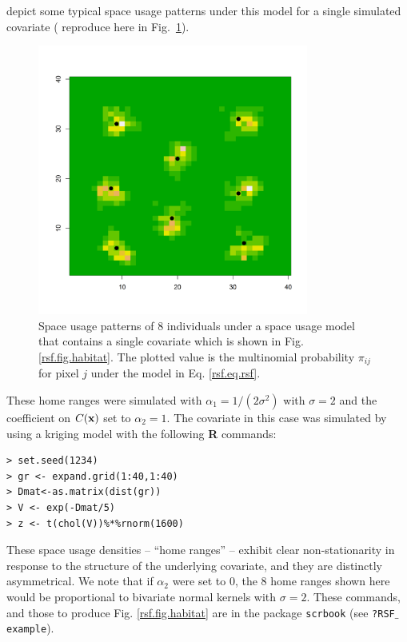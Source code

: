 \citet{royle_etal:2012mee} depict some typical space
usage patterns under this model for a single simulated covariate (
reproduce here in Fig.~\ref{rsf.fig.homeranges}).
\begin{figure}[ht]
\centering
\includegraphics[width=3.5in,height=3.5in]{Ch13-RSF/figs/homeranges8}
\caption{Space usage patterns of 8 individuals under a space usage
  model that contains a single covariate which is shown in
  Fig. \ref{rsf.fig.habitat}. The plotted value is the multinomial
  probability $\pi_{ij}$ for pixel $j$ under the model in Eq. \ref{rsf.eq.rsf}.
}
\label{rsf.fig.homeranges}
\end{figure}
These home ranges were simulated
with $\alpha_{1} =
1/(2\sigma^2)$ with $\sigma = 2$ and the coefficient on $C({\bf x})$
set to $\alpha_{2} = 1$.
The covariate in this case was simulated by using a kriging
model with the following {\bf R} commands:
\begin{verbatim}
> set.seed(1234)
> gr <- expand.grid(1:40,1:40)
> Dmat<-as.matrix(dist(gr))
> V <- exp(-Dmat/5)
> z <- t(chol(V))%*%rnorm(1600)
\end{verbatim}
These space usage densities -- ``home ranges'' -- exhibit clear
non-stationarity in response to the structure of the underlying
covariate, and they are distinctly asymmetrical.  We note that if
$\alpha_{2}$ were set to 0, the 8 home ranges shown here would
be proportional to bivariate normal kernels with $\sigma = 2$.
These commands, and those to produce Fig. \ref{rsf.fig.habitat} are in
the package \mbox{\tt scrbook} (see \mbox{\tt ?RSF$\_$example}).
